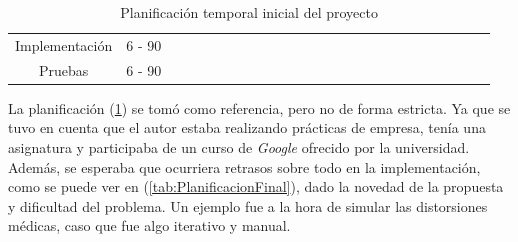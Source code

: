 \begin{table}[htp]
{\begin{tabular}{|c|c|ll|llll|llll|lllll|llll|llll|}
Implementación & 6 - 90 &  &  &  &  &  &  &  &  & & & \cellcolor[HTML]{9B9B9B} & \cellcolor[HTML]{9B9B9B} & \cellcolor[HTML]{9B9B9B} & \cellcolor[HTML]{9B9B9B} & \cellcolor[HTML]{9B9B9B} &  &  &  &  &  &  &  &  \\ \cline{1-1}
Pruebas & 6 - 90 &  &  &  &  &  &  &  &  &  &  &  &  &  &  & & \cellcolor[HTML]{9B9B9B} & \cellcolor[HTML]{9B9B9B} & \cellcolor[HTML]{9B9B9B} & \cellcolor[HTML]{9B9B9B} & &  &  &  \\ \hline
\end{tabular}%
}
\caption{Planificación temporal inicial del proyecto}
\label{tab:PlanificacionTemporal}
\end{table}

La planificación (\ref{tab:PlanificacionTemporal}) se tomó como referencia, pero no de forma estricta. Ya que se 
tuvo en cuenta que el autor estaba realizando prácticas de empresa, tenía 
una asignatura y participaba de un curso de \emph{Google} ofrecido por la universidad.
Además, se esperaba que ocurriera retrasos sobre todo en la implementación, 
como se puede ver en (\ref{tab:PlanificacionFinal}), dado la novedad de la propuesta
y dificultad del problema. Un ejemplo fue a la hora de simular las distorsiones 
médicas, caso que fue algo iterativo y manual. 

